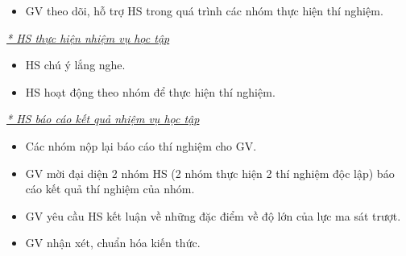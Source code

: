 {\begin{itemize}[label=-]
\begin{itemize}[label=$\bullet$]
\begin{itemize}
\begin{center}
				\end{center}
			\end{itemize}
			\textbf{\textit{Thảo luận và phân tích:}}
			\begin{itemize}
				\item Điều gì xảy ra với độ lớn của lực ma sát trượt khi tăng áp lực lên bề mặt tiếp xúc?
				\item Vẽ đồ thị cho thấy sự thay đổi độ lớn của lực ma sát trượt khi tăng dần độ lớn của áp lực.
			\end{itemize}
		\end{itemize}
		\item GV theo dõi, hỗ trợ HS trong quá trình các nhóm thực hiện thí nghiệm.
		
	\end{itemize}
	\textit{\underline{* HS thực hiện nhiệm vụ học tập}}
	\begin{itemize}[label=-]
		\item HS chú ý lắng nghe.
		\item HS hoạt động theo nhóm để thực hiện thí nghiệm.
	\end{itemize}
	\textit{\underline{* HS báo cáo kết quả nhiệm vụ học tập}}
	\begin{itemize}[label=-]
		\item Các nhóm nộp lại báo cáo thí nghiệm cho GV.
		\item GV mời đại diện 2 nhóm HS (2 nhóm thực hiện 2 thí nghiệm độc lập) báo cáo kết quả thí nghiệm của nhóm.
		\item GV yêu cầu HS kết luận về những đặc điểm về độ lớn của lực ma sát trượt.
		\item GV nhận xét, chuẩn hóa kiến thức.
	\end{itemize}
}
